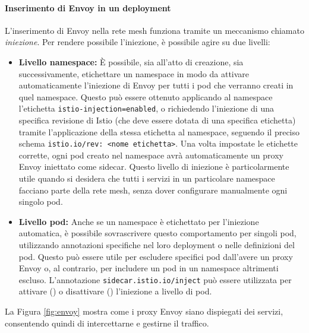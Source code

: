 \paragraph{Inserimento di Envoy in un deployment}
L'inserimento di Envoy nella rete mesh funziona tramite un meccanismo chiamato \textit{iniezione}. Per rendere possibile l'iniezione, è possibile agire su due livelli:
\begin{itemize}
\item \textbf{Livello namespace:} È possibile, sia all'atto di creazione, sia successivamente, etichettare un namespace in modo da attivare automaticamente l'iniezione di Envoy per tutti i pod che verranno creati in quel namespace. Questo può essere ottenuto applicando al namespace l'etichetta \texttt{istio-injection=enabled}, o richiedendo l'iniezione di una specifica revisione di Istio (che deve essere dotata di una specifica etichetta) tramite l'applicazione della stessa etichetta al namespace, seguendo il preciso schema \verb|istio.io/rev: <nome etichetta>|. Una volta impostate le etichette corrette, ogni pod creato nel namespace avrà automaticamente un proxy Envoy iniettato come sidecar. Questo livello di iniezione è particolarmente utile quando si desidera che tutti i servizi in un particolare namespace facciano parte della rete mesh, senza dover configurare manualmente ogni singolo pod.
\item \textbf{Livello pod:} Anche se un namespace è etichettato per l'iniezione automatica, è possibile sovrascrivere questo comportamento per singoli pod, utilizzando annotazioni specifiche nel loro deployment o nelle definizioni del pod. Questo può essere utile per escludere specifici pod dall'avere un proxy Envoy o, al contrario, per includere un pod in un namespace altrimenti escluso. L'annotazione \texttt{sidecar.istio.io/inject} può essere utilizzata per attivare () o disattivare () l'iniezione a livello di pod.

\end{itemize}
La Figura \ref{fig:envoy} mostra come i proxy Envoy siano dispiegati  dei servizi, consentendo quindi di intercettarne e gestirne il traffico.

